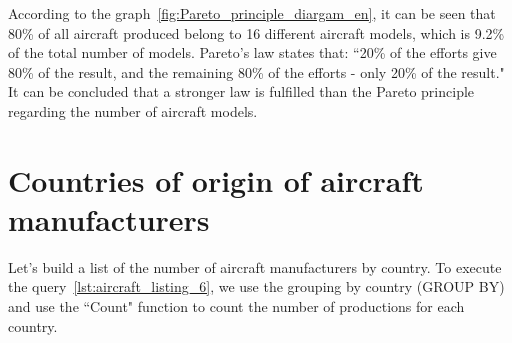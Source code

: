 \begin{figure*}[h]

    \setlength{\fboxsep}{0pt}%
    \setlength{\fboxrule}{1pt}%

	\caption{Percentage of the number of aircraft models produced by all airlines to the total number of aircraft manufactured for all time, 2020.}%
    \label{fig:Pareto_principle_diargam_en}%
\end{figure*}

According to the graph~\ref{fig:Pareto_principle_diargam_en}, it can be seen that 80\% of all aircraft produced belong to 16 different aircraft 
models, which is 9.2\% of the total number of models. Pareto's law states that: ``20\% of the efforts give 80\% of the result, and the remaining 80\%
 of the efforts - only 20\% of the result." It can be concluded that a stronger law is fulfilled than the Pareto principle regarding the number 
 of aircraft models.

\label{question:aircraft_question_3}


\section{Countries of origin of aircraft manufacturers}

Let's build a list of the number of aircraft manufacturers by country. To execute the query~\ref{lst:aircraft_listing_6}, we use the grouping 
by country (GROUP BY) and use the ``Count" function to count the number of productions for each country.

